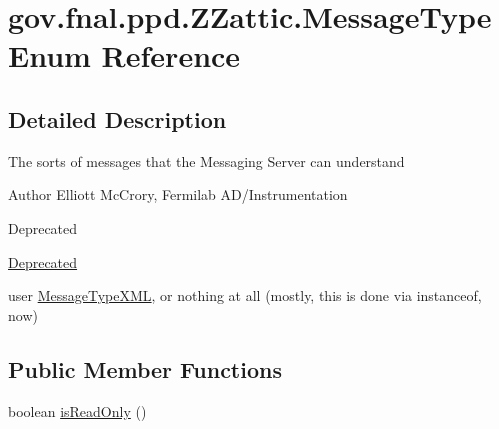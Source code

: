 \hypertarget{enumgov_1_1fnal_1_1ppd_1_1ZZattic_1_1MessageType}{\section{gov.\-fnal.\-ppd.\-Z\-Zattic.\-Message\-Type Enum Reference}
\label{enumgov_1_1fnal_1_1ppd_1_1ZZattic_1_1MessageType}
}


\subsection{Detailed Description}
The sorts of messages that the Messaging Server can understand

\begin{DoxyAuthor}{Author}
Elliott Mc\-Crory, Fermilab A\-D/\-Instrumentation 
\end{DoxyAuthor}
\begin{DoxyRefDesc}{Deprecated}
\item[\hyperlink{deprecated__deprecated000019}{Deprecated}]
\begin{DoxyItemize}
\item user \hyperlink{enumgov_1_1fnal_1_1ppd_1_1ZZattic_1_1MessageTypeXML}{Message\-Type\-X\-M\-L}, or nothing at all (mostly, this is done via instanceof, now)
\end{DoxyItemize}\end{DoxyRefDesc}
\subsection*{Public Member Functions}
\begin{DoxyCompactItemize}
\item 
boolean \hyperlink{enumgov_1_1fnal_1_1ppd_1_1ZZattic_1_1MessageType_af12ae0f8b82f8ffe3fdec70d55f4b00b}{is\-Read\-Only} ()
\end{DoxyCompactItemize}
